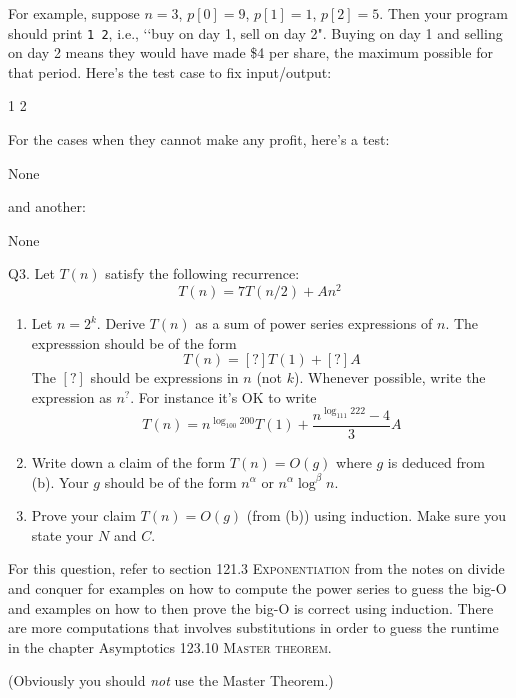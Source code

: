 For example, suppose $n = 3$, $p[0] = 9$, $p[1] = 1$, $p[2] = 5$.
Then your program should print \verb!1 2!, i.e., \lq\lq buy on day 1,
sell on day 2".
Buying on day 1 and selling on day 2 means they
would have made \$4 per share, the maximum possible for that period.
Here's the test case to fix input/output:
\begin{console}[commandchars=\\\{\}]
1 2
\end{console}
For the cases when they cannot make any profit, here's a test:  
\begin{console}[commandchars=\\\{\}]
None
\end{console}
and another:
\begin{console}[commandchars=\\\{\}]
None
\end{console}


\newpage
Q3.
Let $T(n)$ satisfy the following recurrence:
\[
T(n)
= 7 T(n/2) + An^2 
\]
\begin{enumerate}[label=(\alph*)]
\item
  Let $n = 2^k$. Derive $T(n)$ as a sum of power series expressions
  of $n$.
  The expresssion should be of the form
  \[
  T(n) = [?] T(1) + [?] A
  \]
  The $[?]$ should be expressions in $n$ (not $k$).
  Whenever possible, write the expression as $n^?$.
  For instance it's OK to write
  \[
  T(n) = n^{\log_{100} {200}} T(1) + \frac{n^{\log_{111} 222} - 4}{3} A
  \]
\item
  Write down a claim of the form $T(n) = O(g)$ where $g$ is deduced from (b).
  Your $g$ should be of the form $n^\alpha$ or $n^\alpha \log^\beta n$. 
\item
  Prove your claim $T(n) = O(g)$ (from (b)) using induction.
  Make sure you state your $N$ and $C$.
\end{enumerate}

For this question, refer to section \textsc{121.3 Exponentiation} from
the notes on divide and conquer for examples
on how to compute the power series to guess the big-O
and examples on how to then prove the big-O is correct using induction.
There are more computations that involves substitutions in order to guess
the runtime in the chapter Asymptotics
\textsc{123.10 Master theorem}. 

(Obviously you should \textit{not} use the Master Theorem.)

